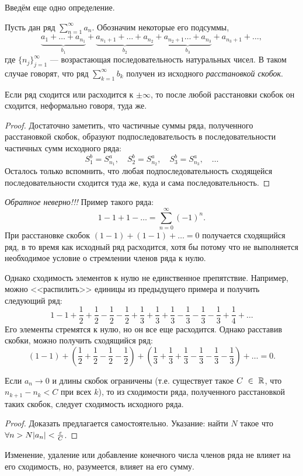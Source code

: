 Введём еще одно определение.

\begin{Def}
	Пусть дан ряд $\sum\limits_{n=1}^{\infty}a_n$. Обозначим некоторые его подсуммы,
	$$
	\underbrace{a_1 + \ldots + a_{n_1}}_{b_1} + \underbrace{a_{n_1+1} + \ldots + a_{n_2}}_{b_2} + \underbrace{a_{n_2 + 1} \ldots + a_{n_3}}_{b_3} + a_{n_3 + 1} + \ldots,
	 $$
	 где $\{n_j\}_{j=1}^{\infty}$ --- возрастающая последовательность натуральных чисел. В таком случае говорят, что ряд $\sum\limits_{k =1}^{\infty} b_k$ получен из исходного \emph{расстановкой скобок}.
\end{Def}
\begin{Statement}
	Если ряд сходится или расходится к $\pm \infty$, то после любой расстановки скобок он сходится, неформально говоря, туда же.
\end{Statement}

\begin{proof}
	Достаточно заметить, что частичные суммы ряда, полученного расстановкой скобок, образуют подпоследовательость в последовательности частичных сумм исходного ряда:
	$$
	S^b_1 = S^a_{n_1}, \quad S^b_{2} = S^a_{n_2}, \quad S^b_3 = S^a_{n_3}, \quad \ldots
	$$
	Осталось только вспомнить, что любая подпоследовательность сходящейся последовательности сходится туда же, куда и сама последовательность.
\end{proof}
\emph{Обратное неверно!!!} Пример такого ряда:
$$
1 - 1 + 1 - \ldots = \sum\limits_{n = 0}^{\infty} \left(-1\right)^n.
$$
При расстановке скобок $(1 - 1) + (1 - 1) + \ldots = 0$ получается сходящийся ряд, в то время как исходный ряд расходится, хотя бы потому что не выполняется необходимое условие о стремлении членов ряда к нулю.

Однако сходимость элементов к нулю не единственное препятствие. Например, можно <<распилить>> единицы из предыдущего примера и получить следующий ряд:
$$
1 - 1 + \frac{1}{2} + \frac{1}{2} - \frac{1}{2} - \frac{1}{2} + \frac{1}{3} + \frac{1}{3} + \frac{1}{3} - \frac{1}{3} - \frac{1}{3} - \frac{1}{3} + \frac{1}{4} + \ldots
$$
Его элементы стремятся к нулю, но он все еще расходится. Однако расставив скобки, можно получить сходящийся ряд:
$$
(1 - 1) + \left(\frac{1}{2} + \frac{1}{2} - \frac{1}{2} - \frac{1}{2}\right) +\left( \frac{1}{3} + \frac{1}{3} + \frac{1}{3} - \frac{1}{3} - \frac{1}{3} - \frac{1}{3}\right) + \ldots = 0.
$$
\begin{Statement}
	Если $a_n \to 0$ и длины скобок ограничены (т.е. существует такое $C~\in~\mathbb{R}$, что $n_{k+1} - n_{k} < C$ при всех $k$), то из сходимости ряда, полученного расстановкой таких скобок, следует сходимость исходного ряда.
\end{Statement}
\begin{proof}
Доказать предлагается самостоятельно. Указание: найти $N$ такое что\\  $\forall n>N|a_n| < \frac{\varepsilon}{C}$.
\end{proof}
\begin{Statement}
	Изменение, удаление или добавление конечного числа членов ряда не влияет на его сходимость, но, разумеется, влияет на его сумму.
\end{Statement}

